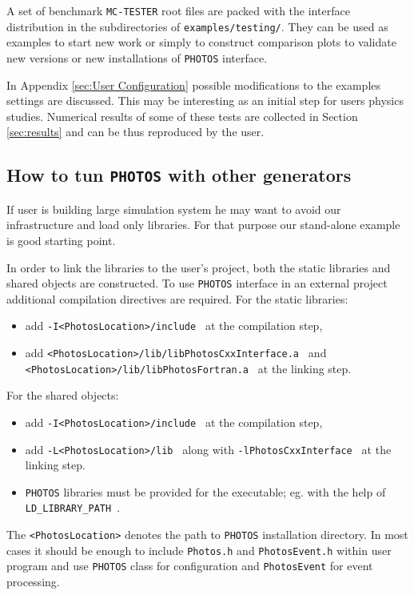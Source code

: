 \documentclass[]{Photos_interface_design}
\begin{document}
A set of benchmark {\tt MC-TESTER} root files are packed with the interface
distribution in the subdirectories of {\tt examples/testing/}. They can be used
as examples to start new work or simply to construct comparison
plots to validate new versions or new installations of {\tt PHOTOS} interface.

In Appendix \ref{sec:User Configuration} possible modifications to the  
examples settings are discussed. This may be interesting as an initial step for users 
physics studies.  Numerical results of some of these tests are collected in Section \ref{sec:results}
and can be thus reproduced by the user.

\subsection{How to tun {\tt PHOTOS} with other generators}
If user is building large simulation system he may want to avoid our 
infrastructure and load only libraries. For that purpose our stand-alone 
example is good starting point.

In order to link the libraries to the user's project, both the static libraries and shared objects are
constructed. To use {\tt PHOTOS} interface in an external project additional 
compilation directives are required. For the static libraries:
\begin{itemize}
  \item add {\tt -I<PhotosLocation>/include } at the compilation step,
  \item add {\tt <PhotosLocation>/lib/libPhotosCxxInterface.a } and\\
        {\tt <PhotosLocation>/lib/libPhotosFortran.a } at the linking step.
\end{itemize}
For the shared objects:
\begin{itemize}
  \item add {\tt -I<PhotosLocation>/include } at the compilation step,
  \item add {\tt -L<PhotosLocation>/lib } along with {\tt -lPhotosCxxInterface } at the linking step.
  \item  {\tt PHOTOS} libraries must be provided for the executable; eg. with the help of  {\tt LD\_LIBRARY\_PATH }.
\end{itemize}
The {\tt <PhotosLocation>} denotes the path to {\tt PHOTOS} installation directory.
In most cases it should be enough to include {\tt Photos.h} and {\tt PhotosEvent.h}
within user program and use {\tt PHOTOS} class for configuration and {\tt PhotosEvent}
for event processing.
\end{document}
